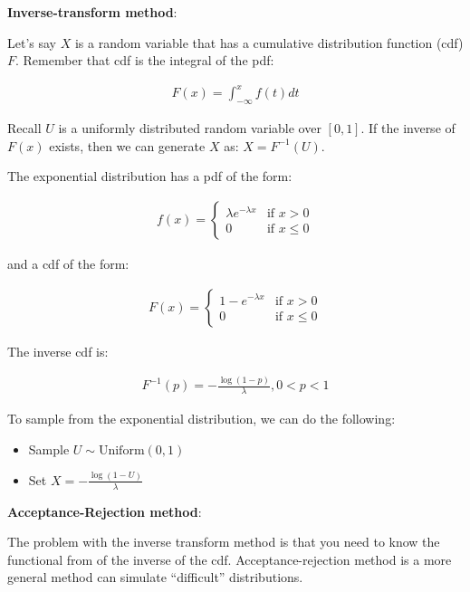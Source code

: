 \bigskip

\noindent \textbf{Inverse-transform method}:

Let’s say $X$ is a random variable that has a cumulative distribution function (cdf) $F$. Remember that cdf is the integral of the pdf:

\begin{align*}
    F(x) = \int_{-\infty}^x f(t)dt
\end{align*}

Recall $U$ is a uniformly distributed random variable over $[0,1]$. If the inverse of $F(x)$ exists, then we can generate $X$ as: $X=F^{-1}(U)$.

The exponential distribution has a pdf of the form:

\begin{align*}
f(x) = 
    \begin{cases}
        \lambda e^{-\lambda x} & \text{if } x>0\\
        0 & \text{if }x\leq 0
    \end{cases}
\end{align*}
    
and a cdf of the form:

\begin{align*}
F(x) = 
    \begin{cases}
        1- e^{-\lambda x} & \text{if } x>0\\
        0 & \text{if }x\leq 0
    \end{cases}
\end{align*}

The inverse cdf is:

\begin{align*}
    F^{-1}(p) = -\frac{\log(1-p)}{\lambda}, 0<p<1
\end{align*}

To sample from the exponential distribution, we can do the following:

\begin{itemize}
    \item Sample $U\sim \text{Uniform}(0,1)$
    \item Set $X = -\frac{\log(1-U)}{\lambda}$
\end{itemize}

\bigskip

\noindent \textbf{Acceptance-Rejection method}:

The problem with the inverse transform method is that you need to know the functional from of the inverse of the cdf. Acceptance-rejection method is a more general method can simulate “difficult” distributions.

